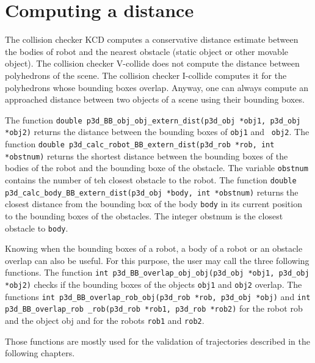 \section{Computing a distance}


The collision checker KCD computes a conservative distance estimate
between the bodies of robot and the nearest obstacle (static object
or other movable object).
The collision checker V-collide does not compute the distance between
polyhedrons of the scene. The collision checker I-collide computes it
for the polyhedrons whose bounding boxes overlap. Anyway, one can
always compute an approached distance between two objects of a scene
using their bounding boxes.

The function {\tt double p3d\_BB\_obj\_obj\_extern\_dist(p3d\_obj
*obj1, p3d\_obj *obj2)} 
returns the distance between the bounding boxes of {\tt obj1} and {\tt
obj2}. The function {\tt double
p3d\_calc\_robot\_BB\_extern\_dist(p3d\_rob *rob, int *obstnum)}
 returns the shortest
distance between the bounding boxes of the bodies of the robot and the
bounding boxe of the obstacle. The variable {\tt obstnum} contains the
number of teh closest obstacle to the robot. The function {\tt double
p3d\_calc\_body\_BB\_extern\_dist(p3d\_obj *body, int *obstnum)}
 returns the closest distance
from the bounding box of the body {\tt body} in its current position
to the bounding boxes of the obstacles. The integer obstnum is the
closest obstacle to {\tt body}.


Knowing when the bounding boxes of a robot, a body of a robot or an
obstacle overlap can also be useful. For this purpose, the user may
call the three following functions. The function {\tt int
p3d\_BB\_overlap\_obj\_obj(p3d\_obj *obj1, p3d\_obj *obj2)}
 checks if
the bounding boxes of the objects {\tt obj1} and {\tt obj2}
overlap. The functions {\tt int p3d\_BB\_overlap\_rob\_obj(p3d\_rob
*rob, p3d\_obj *obj)}  and {\tt int
p3d\_BB\_overlap\_rob \_rob(p3d\_rob *rob1, p3d\_rob *rob2)}
 for the robot {rob} and the object
{obj} and for the robots {\tt rob1} and {\tt rob2}.

Those functions are mostly used for the validation of trajectories
described in the following chapters.


